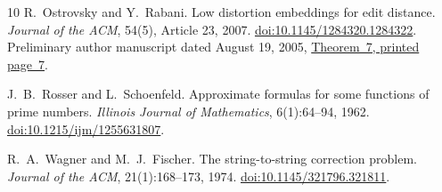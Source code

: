 \begin{thebibliography}{10}
R.~Ostrovsky and Y.~Rabani.
\newblock Low distortion embeddings for edit distance.
\newblock \emph{Journal of the ACM}, 54(5), Article 23, 2007.
\newblock \href{https://doi.org/10.1145/1284320.1284322}{doi:10.1145/1284320.1284322}.
\newblock Preliminary author manuscript dated August 19, 2005,
\href{https://web.cs.ucla.edu/~rafail/PUBLIC/68.pdf}{Theorem~7, printed page~7}.

J.~B.~Rosser and L.~Schoenfeld.
\newblock Approximate formulas for some functions of prime numbers.
\newblock \emph{Illinois Journal of Mathematics}, 6(1):64--94, 1962.
\newblock \href{https://doi.org/10.1215/ijm/1255631807}{doi:10.1215/ijm/1255631807}.

R.~A.~Wagner and M.~J.~Fischer.
\newblock The string-to-string correction problem.
\newblock \emph{Journal of the ACM}, 21(1):168--173, 1974.
\newblock \href{https://doi.org/10.1145/321796.321811}{doi:10.1145/321796.321811}.

\end{thebibliography}
